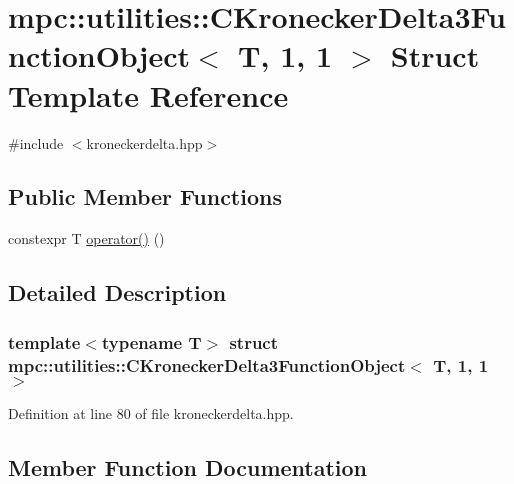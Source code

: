 \hypertarget{structmpc_1_1utilities_1_1_c_kronecker_delta3_function_object_3_01_t_00_011_00_011_01_4}{}\section{mpc\+:\+:utilities\+:\+:C\+Kronecker\+Delta3\+Function\+Object$<$ T, 1, 1 $>$ Struct Template Reference}
\label{structmpc_1_1utilities_1_1_c_kronecker_delta3_function_object_3_01_t_00_011_00_011_01_4}


{\ttfamily \#include $<$kroneckerdelta.\+hpp$>$}

\subsection*{Public Member Functions}
\begin{DoxyCompactItemize}
\item 
constexpr T \mbox{\hyperlink{structmpc_1_1utilities_1_1_c_kronecker_delta3_function_object_3_01_t_00_011_00_011_01_4_a405d6908a9703c7cbdd4accbfb56f32d}{operator()}} ()
\end{DoxyCompactItemize}


\subsection{Detailed Description}
\subsubsection*{template$<$typename T$>$\newline
struct mpc\+::utilities\+::\+C\+Kronecker\+Delta3\+Function\+Object$<$ T, 1, 1 $>$}



Definition at line 80 of file kroneckerdelta.\+hpp.



\subsection{Member Function Documentation}
\mbox{\label{structmpc_1_1utilities_1_1_c_kronecker_delta3_function_object_3_01_t_00_011_00_011_01_4_a405d6908a9703c7cbdd4accbfb56f32d}} 
